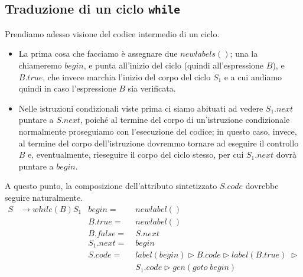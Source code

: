 \documentclass[class=book, crop=false, oneside, 12pt]{standalone}
\begin{document}
\subsection{Traduzione di un ciclo \texttt{while}}
Prendiamo adesso visione del codice intermedio di un ciclo. 
\begin{itemize}
    \item La prima cosa che facciamo è assegnare due \(newlabels()\); una la chiameremo \(begin\), e punta all'inizio del ciclo (quindi all'espressione \(B\)), e \(B.true\), che invece marchia l'inizio del corpo del ciclo \(S_1\) e a cui andiamo quindi in caso l'espressione \(B\) sia verificata.
    \item Nelle istruzioni condizionali viste prima ci siamo abituati ad vedere \(S_1.next\) puntare a \(S.next\), poiché al termine del corpo di un'istruzione condizionale normalmente proseguiamo con l'esecuzione del codice; in questo caso, invece, al termine del corpo dell'istruzione dovremmo tornare ad eseguire il controllo \(B\) e, eventualmente, rieseguire il corpo del ciclo stesso, per cui \(S_1.next\) dovrà puntare a \(begin\).
\end{itemize}
A questo punto, la composizione dell'attributo sintetizzato \(S.code\) dovrebbe seguire naturalmente.
\begin{align*}
    S &\to while (B) S_1 & begin =\; &newlabel() \\
    & & B.true =\; &newlabel() \\
    & & B.false =\; &S.next \\
    & & S_1.next =\; &begin \\
    & & S.code =\; &label(begin) \triangleright B.code \triangleright label(B.true)\; \triangleright \\
    & & &S_1.code \triangleright gen(goto\; begin)
\end{align*}
\end{document}
